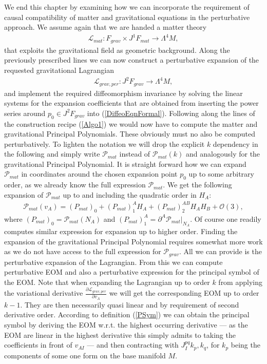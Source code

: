 \documentclass[a4paper,12pt, DIV=14, BCOR=5mm, twoside, headsepline, numbers=noenddot]{scrbook}
\begin{document}
We end this chapter by examining how we can incorporate the requirement of causal compatibility of matter and gravitational equations in the perturbative approach.
We assume again that we are handed a matter theory 
\begin{align}
    \mathcal{L}_{mat} : F_{grav} \times J^1F_{mat} \longrightarrow \Lambda^4M,
\end{align}
that exploits the gravitational field as geometric background. Along the previously prescribed lines we can now construct a perturbative expansion of the requested gravitational Lagrangian
\begin{align}
    \mathcal{L}_{grav,per} : J^2F_{grav} \longrightarrow \Lambda^4M,
\end{align}
and implement the required diffeomorphism invariance by solving the linear systems for the expansion coefficients that are obtained from inserting the power series around $p_0 \in J^2F_{grav}$ into (\ref{DiffeoEqnFormal}). 
Following along the lines of the construction recipe (\ref{Algo1}) we would now have to compute the matter and gravitational Principal Polynomials.
These obviously must no also be computed perturbatively. 
To lighten the notation we will drop the explicit $k$ dependency in the following and simply write $\mathcal{P}_{mat}$ instead of $\mathcal{P}_{mat}(k)$ and analogously for the gravitational Principal Polynomial. It is straight forward how we can expand $\mathcal{P}_{mat}$ in coordinates around the chosen expansion point $p_0$ up to some arbitrary order, as we already know the full expression $\mathcal{P}_{mat}$. We get the following expansion of $\mathcal{P}_{mat}$ up to and including the quadratic order in $H_A$:
\begin{align}
    \mathcal{P}_{mat}(v_A) = (P_{mat})_{0} + (P_{mat})^A_1 H_A+ (P_{mat})^{AB}_2 H_A H_B +\mathcal{O}(3),
\end{align}
where $(P_{mat})_0 = \mathcal{P}_{mat}(N_A)$ and $(P_{mat})_1^A = \partial^A \mathcal{P}_{mat} \vert _{N_A}$. Of course one readily computes similar expression for expansion up to higher order. 
Finding the expansion of the gravitational Principal Polynomial requires somewhat more work as we do not have access to the full expression for $\mathcal{P}_{grav}$. All we can provide is the perturbative expansion of the Lagrangian. From this we can compute perturbative EOM and also a perturbative expression for the principal symbol of the EOM.
Note that when expanding the Lagrangian up to order $k$ from applying the variational derivative $\frac{\partial\mathcal L_{grav,per}}{\partial v_A}$ we will get the corresponding EOM up to order $k-1$. They are then necessarily quasi linear and by requirement of second derivative order. According to definition (\ref{PSym}) we can obtain the principal symbol by deriving the EOM w.r.t. the highest occurring derivative  --- as the EOM are linear in the highest derivative this simply admits to taking the coefficients in front of $v_{AI}$ --- and then contracting with $J_I^{pq} k_p, k_q$, for $k_p$ being the components of some one form on the base manifold $M$. 
\end{document}
